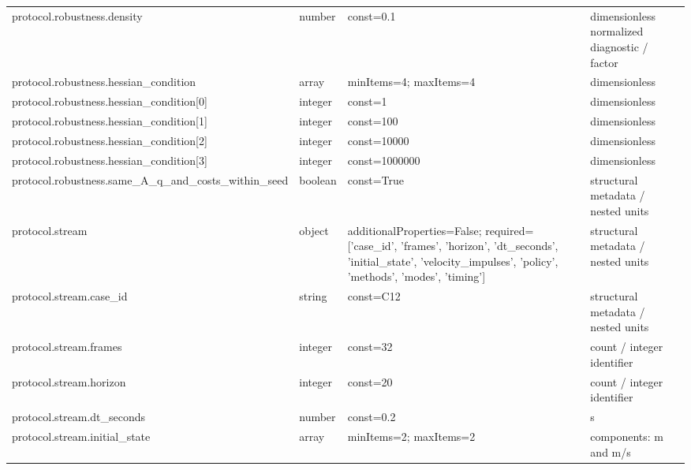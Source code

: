 \begin{longtable}{@{}>{\raggedright\arraybackslash}p{}>{\raggedright\arraybackslash}p{}>{\raggedright\arraybackslash}p{}>{\raggedright\arraybackslash}p{}@{}}
protocol.\allowbreak{}robustness.\allowbreak{}density & number & const=\allowbreak{}0.\allowbreak{}1 & dimensionless normalized diagnostic /\allowbreak{} factor\\
protocol.\allowbreak{}robustness.\allowbreak{}hessian\_\allowbreak{}condition & array & minItems=\allowbreak{}4; maxItems=\allowbreak{}4 & dimensionless\\
protocol.\allowbreak{}robustness.\allowbreak{}hessian\_\allowbreak{}condition[0] & integer & const=\allowbreak{}1 & dimensionless\\
protocol.\allowbreak{}robustness.\allowbreak{}hessian\_\allowbreak{}condition[1] & integer & const=\allowbreak{}100 & dimensionless\\
protocol.\allowbreak{}robustness.\allowbreak{}hessian\_\allowbreak{}condition[2] & integer & const=\allowbreak{}10000 & dimensionless\\
protocol.\allowbreak{}robustness.\allowbreak{}hessian\_\allowbreak{}condition[3] & integer & const=\allowbreak{}1000000 & dimensionless\\
protocol.\allowbreak{}robustness.\allowbreak{}same\_\allowbreak{}A\_\allowbreak{}q\_\allowbreak{}and\_\allowbreak{}costs\_\allowbreak{}within\_\allowbreak{}seed & boolean & const=\allowbreak{}True & structural metadata /\allowbreak{} nested units\\
protocol.\allowbreak{}stream & object & additionalProperties=\allowbreak{}False; required=\allowbreak{}['case\_\allowbreak{}id', 'frames', 'horizon', 'dt\_\allowbreak{}seconds', 'initial\_\allowbreak{}state', 'velocity\_\allowbreak{}impulses', 'policy', 'methods', 'modes', 'timing'] & structural metadata /\allowbreak{} nested units\\
protocol.\allowbreak{}stream.\allowbreak{}case\_\allowbreak{}id & string & const=\allowbreak{}C12 & structural metadata /\allowbreak{} nested units\\
protocol.\allowbreak{}stream.\allowbreak{}frames & integer & const=\allowbreak{}32 & count /\allowbreak{} integer identifier\\
protocol.\allowbreak{}stream.\allowbreak{}horizon & integer & const=\allowbreak{}20 & count /\allowbreak{} integer identifier\\
protocol.\allowbreak{}stream.\allowbreak{}dt\_\allowbreak{}seconds & number & const=\allowbreak{}0.\allowbreak{}2 & s\\
protocol.\allowbreak{}stream.\allowbreak{}initial\_\allowbreak{}state & array & minItems=\allowbreak{}2; maxItems=\allowbreak{}2 & components: m and m/\allowbreak{}s\\

\end{longtable}
